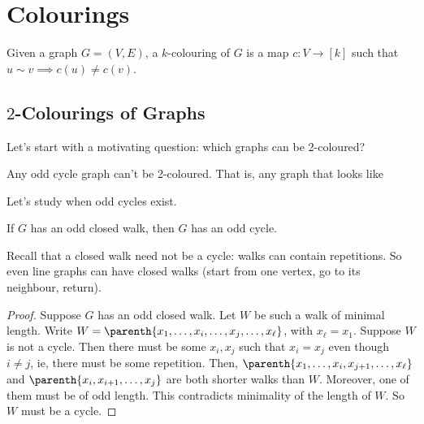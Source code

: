 \section{Colourings}

\begin{boxdefinition}[Colouring]
    Given a graph $G = (V, E)$, a $k$-colouring of $G$ is a map $c : V \to [k]$ such that $u \sim v \implies c(u) \ne c(v)$.
\end{boxdefinition}

\subsection{$2$-Colourings of Graphs}

Let's start with a motivating question: which graphs can be 2-coloured?

Any odd cycle graph can't be 2-coloured. That is, any graph that looks like
\begin{figure}[H]
    \centering
\end{figure}

Let's study when odd cycles exist.

\begin{boxlemma}\label{Ch1:Lemma:Odd_Closed_Walk}
    If $G$ has an odd closed walk, then $G$ has an odd cycle.
\end{boxlemma}
Recall that a closed walk need not be a cycle: walks can contain repetitions. So even line graphs can have closed walks (start from one vertex, go to its neighbour, return).
\begin{proof}
    Suppose $G$ has an odd closed walk. Let $W$ be such a walk of minimal length. Write $W = \parenth{x_1, \ldots, x_i, \ldots, x_j, \ldots, x_{\ell}}$, with $x_{\ell} = x_1$. Suppose $W$ is not a cycle. Then there must be some $x_i, x_j$ such that $x_i = x_j$ even though $i \neq j$, ie, there must be some repetition. Then, $\parenth{x_1, \ldots, x_i, x_{j+1}, \ldots, x_{\ell}}$ and $\parenth{x_i, x_{i+1}, \ldots, x_{j}}$ are both shorter walks than $W$. Moreover, one of them must be of odd length. This contradicts minimality of the length of $W$. So $W$ must be a cycle.
\end{proof}

